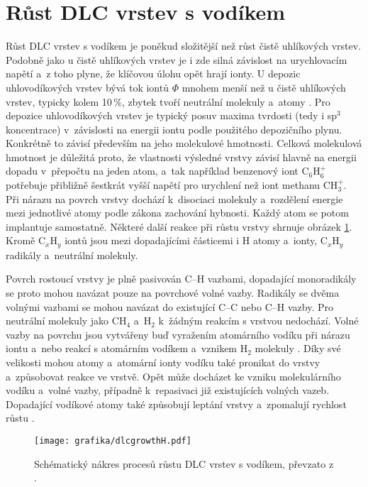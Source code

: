 \section{Růst DLC vrstev s vodíkem}
Růst DLC vrstev s vodíkem je poněkud složitější než růst čistě uhlíkových vrstev. Podobně jako u čistě uhlíkových vrstev je i zde silná závislost na urychlovacím napětí a~z toho plyne, že klíčovou úlohu opět hrají ionty. U depozic uhlovodíkových vrstev bývá tok iontů $\Phi$ mnohem menší než u čistě uhlíkových vrstev, typicky kolem 10\,\%, zbytek tvoří neutrální molekuly a~atomy \cite{Koidl1991}. 
Pro depozice uhlovodíkových vrstev je typický posuv maxima tvrdosti (tedy i sp$^3$ koncentrace) v~závislosti na energii iontu podle použitého depozičního plynu. Konkrétně to závisí především na jeho molekulové hmotnosti. 
Celková molekulová hmotnost je důležitá proto, že vlastnosti výsledné vrstvy závisí hlavně na energii dopadu v~přepočtu na jeden atom, a~tak například benzenový iont C$_6$H$_6^+$ potřebuje přibližně šestkrát vyšší napětí pro urychlení než iont methanu CH$_3^+$. 
Při nárazu na povrch vrstvy dochází k~disociaci molekuly a~rozdělení energie mezi jednotlivé atomy podle zákona zachování hybnosti. Každý atom se potom implantuje samostatně. Některé další reakce při růstu vrstvy shrnuje obrázek \ref{dlcgrowthH}. Kromě C$_x$H$_y$ iontů jsou mezi dopadajícími částicemi i H atomy a~ionty, C$_x$H$_y$ radikály a~neutrální molekuly.

Povrch rostoucí vrstvy je plně pasivován C--H vazbami, dopadající monoradikály se proto mohou navázat pouze na povrchové volné vazby. Radikály se dvěma volnými vazbami se mohou navázat do existující C--C nebo C--H vazby. Pro neutrální molekuly jako CH$_4$ a~H$_2$ k~žádným reakcím s vrstvou nedochází. Volné vazby na povrchu jsou vytvářeny buď vyražením atomárního vodíku při nárazu iontu a~nebo reakcí s atomárním vodíkem a~vznikem H$_2$ molekuly \cite{Keudell2001}. Díky své velikosti mohou atomy a~atomární ionty vodíku také pronikat do vrstvy a~způsobovat reakce ve vrstvě. Opět může docházet ke vzniku molekulárního vodíku a~volné vazby, případně k~repasivaci již existujících volných vazeb. Dopadající vodíkové atomy také způsobují leptání vrstvy a~zpomalují rychlost růstu \cite{Keudell1996}.

\begin{figure}[btp]
  \centering
  \texttt{[image: grafika/dlcgrowthH.pdf]}
  \caption{Schématický nákres procesů růstu DLC vrstev s vodíkem, převzato z \cite{Robertson2002}.}
  \label{dlcgrowthH}
\end{figure}

